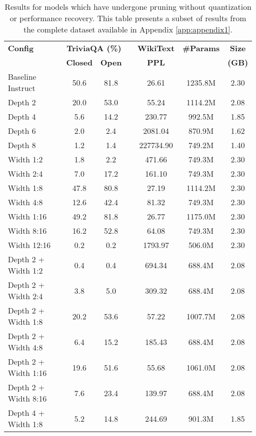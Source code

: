 {\begin{table}[htbp]
\centering
\footnotesize
\caption[Results for Pruning-Only Configurations (Subset)]{Results for models which have undergone pruning without quantization or performance recovery. This table presents a subset of results from the complete dataset available in Appendix \ref{app:appendix1}.} \label{tab:pruning_only_results}
\label{tab:depth_pruning_results}
\begin{tabular}{lcccccc}
\hline
\textbf{Config} & \multicolumn{2}{c}{\textbf{TriviaQA (\%)}} & & \textbf{WikiText} & \textbf{\#Params} & \textbf{Size} \\
\cline{2-3}
& \textbf{Closed} & \textbf{Open} & & \textbf{PPL} & & \textbf{(GB)} \\
\hline
Baseline Instruct & 50.6 & 81.8 & & 26.61 & 1235.8M & 2.30 \\
Depth 2 & 20.0 & 53.0 & & 55.24 & 1114.2M & 2.08 \\
Depth 4 & 5.6 & 14.2 & & 230.77 & 992.5M & 1.85 \\
Depth 6 & 2.0 & 2.4 & & 2081.04 & 870.9M & 1.62 \\
Depth 8 & 1.2 & 1.4 & & 227734.90 & 749.2M & 1.40 \\
Width 1:2 & 1.8 & 2.2 & & 471.66 & 749.3M & 2.30 \\
Width 2:4 & 7.0 & 17.2 & & 161.10 & 749.3M & 2.30 \\
Width 1:8 & 47.8 & 80.8 & & 27.19 & 1114.2M & 2.30 \\
Width 4:8 & 12.6 & 42.4 & & 81.32 & 749.3M & 2.30 \\
Width 1:16 & 49.2 & 81.8 & & 26.77 & 1175.0M & 2.30 \\
Width 8:16 & 16.2 & 52.8 & & 64.08 & 749.3M & 2.30 \\
Width 12:16 & 0.2 & 0.2 & & 1793.97 & 506.0M & 2.30 \\
Depth 2 + Width 1:2 & 0.4 & 0.4 & & 694.34 & 688.4M & 2.08 \\
Depth 2 + Width 2:4 & 3.8 & 5.0 & & 309.32 & 688.4M & 2.08 \\
Depth 2 + Width 1:8 & 20.2 & 53.6 & & 57.22 & 1007.7M & 2.08 \\
Depth 2 + Width 4:8 & 6.4 & 15.2 & & 185.43 & 688.4M & 2.08 \\
Depth 2 + Width 1:16 & 19.6 & 51.6 & & 55.68 & 1061.0M & 2.08 \\
Depth 2 + Width 8:16 & 7.6 & 23.4 & & 139.97 & 688.4M & 2.08 \\
Depth 4 + Width 1:8 & 5.2 & 14.8 & & 244.69 & 901.3M & 1.85 \\

\end{tabular}
\end{table}}
